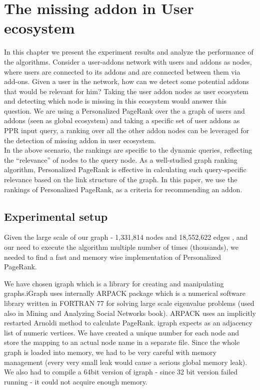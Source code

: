 \documentclass[11pt,oneside]{book}
\let\Oldsection\section
\renewcommand{\section}{\FloatBarrier\Oldsection}
\begin{document}
\chapter{The missing addon in User ecosystem}
\label{chap:user_ecosystem}

In this chapter we present the experiment results and analyze the performance of the algorithms.
Consider a user-addons network
with users and addons as nodes, where users are connected to its addons and are connected between them via add-ons. Given a user
in the network, how can we detect some potential addons that would be relevant for him? Taking the user addon nodes as user ecosystem and detecting which node is missing in this ecosystem would answer this question. We are using a Personalized PageRank over the a graph of users and addons (seen as global ecosystem) and taking a specific set of user addons as PPR input query, a ranking over all the
other addon nodes can be leveraged for the detection of missing addon in user ecosystem.\\
In the above scenario, the rankings are specific to the dynamic
queries, reflecting the “relevance” of nodes to the query node. As a
well-studied graph ranking algorithm, Personalized PageRank \citep{page1999pagerank} is effective in calculating such query-specific relevance based
on the link structure of the graph. In this paper, we use the rankings of Personalized PageRank, as a criteria for recommending an addon.

\section{Experimental setup}

Given the large scale of our graph - 1,331,814 nodes and 18,552,622 edges , and our need to execute the algorithm multiple number of times (thousands), we needed to find a fast and memory wise implementation of Personalized PageRank.

We have chosen igraph \citep{igraph} which is a library for creating and manipulating graphs.iGraph uses internally ARPACK package which is a numerical software library written in FORTRAN 77 for solving large scale eigenvalue problems (used also in Mining and Analyzing Social Networks book). ARPACK uses an implicitly restarted Arnoldi method to calculate PageRank. igraph expects as an adjacency list of numeric vertices. We have created a unique number for each node and store the mapping to an actual node name in a separate file. Since the whole graph is loaded into memory, we had to be very careful with memory management (every very small leak would cause a serious global memory leak). We also had to compile a 64bit version of igraph - since 32 bit version failed running - it could not acquire enough memory.
\end{document}

